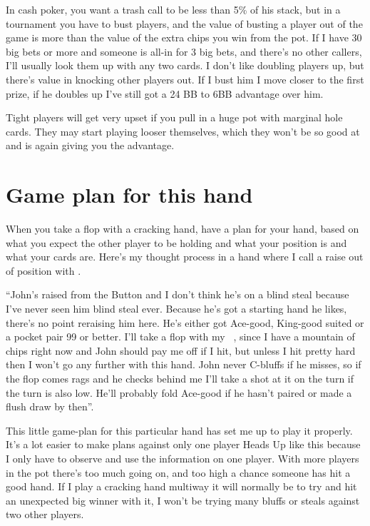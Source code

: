 In cash poker, you want a trash call to be less than 5\% of his stack,
but in a tournament you have to bust players, and the value of
busting a player out of the game is more than the value of the
extra chips you win from the pot. If I have 30 big bets or more and
someone is all-in for 3 big bets, and there's no other callers, I'll
usually look them up with any two cards. I don't like doubling players
up, but there's value in knocking other players out. If I bust him
I move closer to the first prize, if he doubles up I've still got
a 24 BB to 6BB advantage over him.

Tight players will get very upset if you pull in a huge pot
with marginal hole cards. They may start playing looser themselves,
which they won't be so good at and is again giving you the advantage.

\section{Game plan for this hand}

When you take a flop with a cracking hand, have a plan for your hand,
based on what you expect the other player to be holding and what your
position is and what your cards are. Here's my thought process
in a hand where I call a raise out of position with \eigc\sixc.

``John's raised from the Button and I don't think he's on a blind
steal because I've never seen him blind steal ever. Because he's
got a starting hand he likes, there's no point reraising him here. He's
either got Ace-good, King-good suited or a pocket pair 99 or better.
I'll take a flop with my \eigc\sixc\ , since I have a mountain of
chips right now and John should pay me off if I hit, but unless I
hit pretty hard then I won't go any further with this hand. John
never C-bluffs if he misses, so if the flop comes rags and he checks
behind me I'll take a shot at it on the turn if the turn is also low.
He'll probably fold Ace-good if he hasn't paired or made a flush
draw by then''.

This little game-plan for this particular hand has set me
up to play it properly. It's a lot easier to make plans
against only one player Heads Up like this because I only have
to observe and use the information on one player. With more players
in the pot there's too much going on, and too high a chance someone
has hit a good hand. If I play a cracking hand multiway it will
normally be to try and hit an unexpected big winner with it, I won't
be trying many bluffs or steals against two other players.

